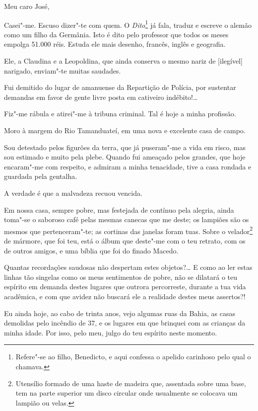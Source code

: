 \asterisc

\noindent{}Meu caro José,\smallskip


Casei"-me. Escuso dizer"-te com quem. O \emph{Dito}\footnote{Refere"-se
  ao filho, Benedicto, e aqui confessa o apelido carinhoso pelo qual o
  chamava.} já fala, traduz e escreve o alemão como um filho da
Germânia. Isto é dito pelo professor que todos os meses empolga 51.000
réis. Estuda ele mais desenho, francês, inglês e geografia.

Ele, a Claudina e a Leopoldina, que ainda conserva o mesmo nariz de
{[}ilegível{]} narigado, enviam"-te muitas saudades.

Fui demitido do lugar de amanuense da Repartição de Polícia, por
sustentar demandas em favor de gente livre posta em cativeiro
indébito!\ldots{}

Fiz"-me rábula e atirei"-me à tribuna criminal. Tal é hoje a minha
profissão.

Moro à margem do Rio Tamanduateí, em uma nova e excelente casa de campo.

Sou detestado pelos figurões da terra, que já puseram"-me a vida em
risco, mas sou estimado e muito pela plebe. Quando fui ameaçado pelos
grandes, que hoje encaram"-me com respeito, e admiram a minha tenacidade,
tive a casa rondada e guardada pela gentalha.

A verdade é que a malvadeza recuou vencida.

Em nossa casa, sempre pobre, mas festejada de contínuo pela alegria,
ainda toma"-se o saboroso café pelas mesmas canecas que me deste; os
lampiões são os mesmos que pertenceram"-te; as cortinas das janelas foram
tuas. Sobre o velador\footnote{Utensílio formado de uma haste de
  madeira que, assentada sobre uma base, tem na parte superior um disco
  circular onde usualmente se colocava um lampião ou velas.} de mármore,
que foi teu, está o álbum que deste"-me com o teu retrato, com os de
outros amigos, e uma bíblia que foi do finado Macedo.

Quantas recordações saudosas não despertam estes objetos?\ldots{} E como ao
ler estas linhas tão singelas como os meus sentimentos de pobre, não se
dilatará o teu espírito em demanda destes lugares que outrora
percorreste, durante a tua vida acadêmica, e com que avidez não buscará
ele a realidade destes meus assertos?!

Eu ainda hoje, ao cabo de trinta anos, vejo algumas ruas da Bahia, as
casas demolidas pelo incêndio de 37, e os lugares em que brinquei com as
crianças da minha idade. Por isso, pelo meu, julgo do teu espírito neste
momento.


